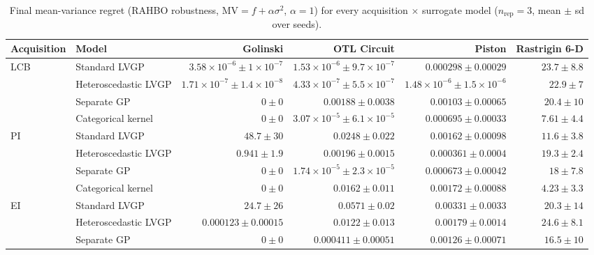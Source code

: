 \begin{table}[htbp]
\centering
\small
\setlength{\tabcolsep}{4pt}
\setlength{\fboxsep}{2pt}
\caption{Final mean-variance regret (RAHBO robustness, $\mathrm{MV}=f+\alpha\sigma^2$, $\alpha=1$) for every acquisition $\times$ surrogate model ($n_{\mathrm{rep}}=3$, mean $\pm$ sd over seeds).}
\label{tab:mv_nrep03}
\begin{tabular}{llrrrr}
\toprule
Acquisition & Model & Golinski & OTL Circuit & Piston & Rastrigin 6-D \\
\midrule
LCB & Standard LVGP & $3.58{\times}10^{-6} \pm 1{\times}10^{-7}$ & $1.53{\times}10^{-6} \pm 9.7{\times}10^{-7}$ & $0.000298 \pm 0.00029$ & $23.7 \pm 8.8$ \\
 & Heteroscedastic LVGP & $1.71{\times}10^{-7} \pm 1.4{\times}10^{-8}$ & \colorbox{green!20}{{\boldmath$4.33{\times}10^{-7} \pm 5.5{\times}10^{-7}$}} & \colorbox{green!20}{{\boldmath$1.48{\times}10^{-6} \pm 1.5{\times}10^{-6}$}} & $22.9 \pm 7$ \\
 & Separate GP & \colorbox{green!20}{{\boldmath$0 \pm 0$}} & $0.00188 \pm 0.0038$ & $0.00103 \pm 0.00065$ & $20.4 \pm 10$ \\
 & Categorical kernel & \colorbox{green!20}{{\boldmath$0 \pm 0$}} & $3.07{\times}10^{-5} \pm 6.1{\times}10^{-5}$ & $0.000695 \pm 0.00033$ & {\boldmath$7.61 \pm 4.4$} \\
\midrule
PI & Standard LVGP & $48.7 \pm 30$ & $0.0248 \pm 0.022$ & $0.00162 \pm 0.00098$ & $11.6 \pm 3.8$ \\
 & Heteroscedastic LVGP & $0.941 \pm 1.9$ & $0.00196 \pm 0.0015$ & {\boldmath$0.000361 \pm 0.0004$} & $19.3 \pm 2.4$ \\
 & Separate GP & \colorbox{green!20}{{\boldmath$0 \pm 0$}} & {\boldmath$1.74{\times}10^{-5} \pm 2.3{\times}10^{-5}$} & $0.000673 \pm 0.00042$ & $18 \pm 7.8$ \\
 & Categorical kernel & \colorbox{green!20}{{\boldmath$0 \pm 0$}} & $0.0162 \pm 0.011$ & $0.00172 \pm 0.00088$ & \colorbox{green!20}{{\boldmath$4.23 \pm 3.3$}} \\
\midrule
EI & Standard LVGP & $24.7 \pm 26$ & $0.0571 \pm 0.02$ & $0.00331 \pm 0.0033$ & $20.3 \pm 14$ \\
 & Heteroscedastic LVGP & $0.000123 \pm 0.00015$ & $0.0122 \pm 0.013$ & $0.00179 \pm 0.0014$ & $24.6 \pm 8.1$ \\
 & Separate GP & \colorbox{green!20}{{\boldmath$0 \pm 0$}} & {\boldmath$0.000411 \pm 0.00051$} & {\boldmath$0.00126 \pm 0.00071$} & $16.5 \pm 10$ \\

\end{tabular}
\end{table}

